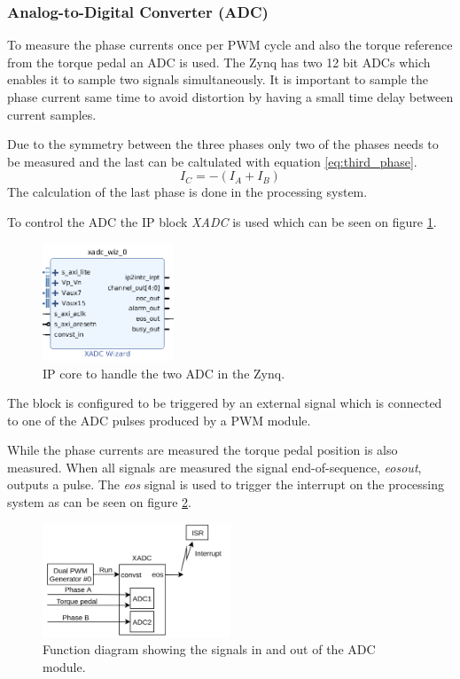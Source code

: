 \subsubsection{Analog-to-Digital Converter (ADC)}

To measure the phase currents once per PWM cycle and also the torque reference from the torque pedal an ADC is used. The Zynq has two 12 bit ADCs which enables it to sample two signals simultaneously. It is important to sample the phase current same time to avoid distortion by having a small time delay between current samples. 

Due to the symmetry between the three phases only two of the phases needs to be measured and the last can be caltulated with equation \ref{eq:third_phase}.
\begin{equation}
    I_C = -(I_A + I_B)
    \label{eq:third_phase}
\end{equation}
The calculation of the last phase is done in the processing system.

To control the ADC the IP block \textit{XADC} is used which can be seen on figure \ref{fig:adc_module}. 

\begin{figure}[H]
	\centering
	\includegraphics[width=0.35\textwidth]{pictures/software/adc.png}
	\caption{IP core to handle the two ADC in the Zynq.}
	\label{fig:adc_module}
\end{figure}

The block is configured to be triggered by an external signal which is connected to one of the ADC pulses produced by a PWM module.

While the phase currents are measured the torque pedal position is also measured. When all signals are measured the signal end-of-sequence, \textit{eos\textunderscore out}, outputs a pulse. The \textit{eos} signal is used to trigger the interrupt on the processing system as can be seen on figure \ref{fig:adc_block_diagram}.

\begin{figure}[H]
	\centering
	\includegraphics[width=0.5\textwidth]{pictures/software/adc_block_diagram.png}
	\caption{Function diagram showing the signals in and out of the ADC module.}
	\label{fig:adc_block_diagram}
\end{figure}



